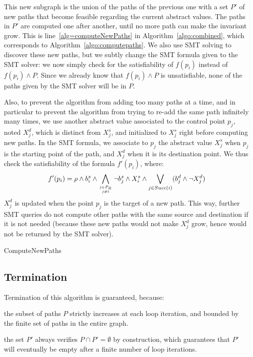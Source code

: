 \documentclass{llncs}
\begin{document}
This new subgraph is the union of the paths of the previous one with a set
$P'$ of new paths that become feasible regarding the current abstract values.
The paths in $P'$ are computed one after another, until no more path
can make the invariant grow. This is line~\ref{alg=computeNewPaths} in
Algorithm~\ref{algo:combined}, which corresponds to
Algorithm~\ref{algo:computepaths}. We also use SMT solving to discover
these new paths, but we subtly change the SMT formula given to the
SMT solver: we now simply check for the satisfiability of $f(p_i)$
instead of $f(p_i) \wedge P$. Since we already know that $f(p_i)
\wedge P$ is unsatisfiable, none of the paths given by the SMT solver
will be in $P$.

Also, to prevent the algorithm from adding too many paths at a time,
and in particular to prevent the algorithm from trying to re-add the
same path infinitely many times, we use another abstract value
associated to the control point $p_j$, noted $X_j^d$, which is distinct
from $X_j^s$, and initialized to $X_j^s$ right before computing new paths. 
In the SMT formula, we associate to $p_j$ the abstract value $X_j^s$ when $p_j$
is the starting point of the path, and $X_j^d$ when it is its destination point.
We thus check the satisfiability of the formula
$f'(p_i)$, where:
\vspace{-.5em}
\[
f'(p_i) = \rho \wedge b_i^s \wedge 
\displaystyle\bigwedge_{j \in P_R \atop j \neq i} \neg
b_j^s \wedge X_i^s \wedge \displaystyle\bigvee_{j \in Succ(i)} (b_j^d \wedge
\neg X_j^d)
\vspace{-1em}
\]
$X_j^d$ is updated when the point $p_j$ is the target of a new path.
This way, further SMT queries do not
compute other paths with the same source and destination if it is not
needed (because these new paths would not make $X_j^d$ grow, hence
would not be returned by the SMT solver).

\begin{algorithm}
	\caption{ComputeNewPaths}
	\label{algo:computepaths}
	\begin{algorithmic}[1] 
	
	\end{algorithmic}
\end{algorithm}

\subsection{Termination}
Termination of this algorithm is guaranteed, because:
\begin{inparaenum}
\item 
the subset of paths $P$ strictly increases at each loop iteration, and bounded by the finite set of
paths in the entire graph. 
\item the set $P'$ always verifies $P \cap P' = \emptyset$ by construction, 
which guarantees that $P'$
will eventually be empty after a finite number of loop iterations.
\end{inparaenum}
\end{document}
